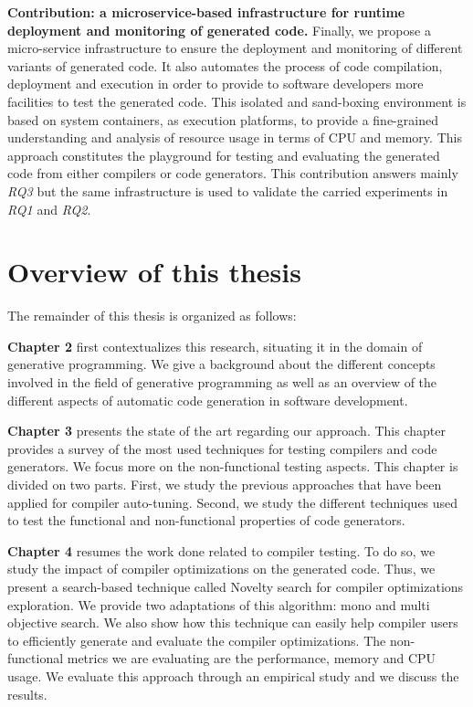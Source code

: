 \textbf{Contribution: a microservice-based infrastructure for runtime deployment and monitoring of generated code.}
Finally, we propose a micro-service infrastructure to ensure the deployment and monitoring of different variants of generated code. 
It also automates the process of code compilation, deployment and execution in order to provide to software developers more facilities to test the generated code. 
This isolated and sand-boxing environment is based on system containers, as execution platforms, to provide a fine-grained understanding and analysis of resource usage in terms of CPU and memory. This approach constitutes the playground for testing and evaluating the generated code from either compilers or code generators. This contribution answers mainly \textit{RQ3} but the same infrastructure is used to validate the carried experiments in \textit{RQ1} and \textit{RQ2}.

\section{Overview of this thesis}
The remainder of this thesis is organized  as follows:

\textbf{Chapter 2} first contextualizes this research, situating it in the domain of generative programming. We give a background about the different concepts involved in the field of generative programming as well as an overview of the different aspects of automatic code generation in software development. 


\textbf{Chapter 3} presents the state of the art regarding our approach. This chapter provides a survey of the most used techniques for testing compilers and code generators. We focus more on the non-functional testing aspects.
This chapter is divided on two parts. First, we study the previous approaches that have been applied for compiler auto-tuning. Second, we study the different techniques used to test the functional and non-functional properties of code generators. 

\textbf{Chapter 4} resumes the work done related to compiler testing. To do so, we study the impact of compiler optimizations on the generated code. Thus, we present a search-based technique called Novelty search for compiler optimizations exploration. We provide two adaptations of this algorithm: mono and multi objective search. We also show how this technique can easily help compiler users to efficiently generate and evaluate the compiler optimizations. The non-functional metrics we are evaluating are the performance, memory and CPU usage. We evaluate this approach through an empirical study and we discuss the results.

